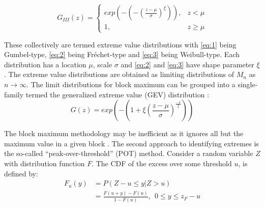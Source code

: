 \begin{equation}
    G_{III}(z) =
    \begin{cases}
        exp\left(-\left( -\left(\frac{z-\mu}{\sigma} \right)^{\xi} \right) \right), & z < \mu    \\
        1,                                                                          & z \geq \mu
    \end{cases}
    \label{eq:3}
\end{equation}


These collectively are termed extreme value distributions with \ref{eq:1} being Gumbel-type, \ref{eq:2} being Fr\'echet-type and \ref{eq:3} being Weibull-type. Each distribution has a location $\mu$, scale $\sigma$ and \ref{eq:2} and \ref{eq:3} have shape parameter $\xi$. The extreme value distributions are obtained as limiting distributions of $M_n$ as $n \to \infty$. The limit distributions for block maximum can be grouped into a single-family termed the generalized extreme value (GEV) distribution \citep{dehaan2007extreme}:
\begin{equation}
    G(z) = exp\left(-\left(1+\xi\left(\frac{z-\mu}{\sigma}\right)^{\frac{-1}{\xi}}\right)\right)
    \label{eq:GEV}
\end{equation}

The block maximum methodology may be inefficient as it ignores all but the maximum value in a given block \citep{davison2015statistics}. The second approach to identifying extremes is the so-called ``peak-over-threshold'' (POT) method. Consider a random variable $Z$ with distribution function $F$. The CDF of the excess over some threshold $u$, is defined by:
\begin{equation}
    \begin{aligned}
        F_u(y) & = P(Z - u \leq y | Z > u)                               \\
               & = \frac{F(u+y) - F(u)}{1-F(u)}, \ \ 0 \leq y \leq z_F-u
    \end{aligned}
    \label{eq:exceed}
\end{equation}

